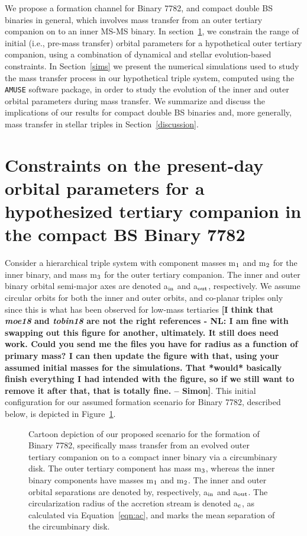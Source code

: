 \documentclass{aastex62}
\def\simon#1{{\bf {\color{red}[#1 -- Simon]}}}
\begin{document}
We propose a formation channel for Binary 7782, and compact double BS
binaries in general, which involves mass transfer from an outer
tertiary companion on to an inner MS-MS binary.  In section~\ref{dyn},
we constrain the range of initial (i.e., pre-mass transfer) orbital
parameters for a hypothetical outer tertiary companion, using a
combination of dynamical and stellar evolution-based constraints.  In
Section~\ref{sims} we present the numerical simulations used to study
the mass transfer process in our hypothetical triple system, computed
using the \texttt{AMUSE}\cite{AMUSE} software package, in order to
study the evolution of the inner and outer orbital parameters during
mass transfer.  We summarize and discuss the implications of our
results for compact double BS binaries and, more generally, mass
transfer in stellar triples in Section~\ref{discussion}.

\section{Constraints on the present-day orbital parameters for a hypothesized tertiary companion in the compact BS Binary 7782} \label{dyn}

Consider a hierarchical triple system with component masses m$_{\rm
  1}$ and m$_{\rm 2}$ for the inner binary, and mass m$_{\rm 3}$ for
the outer tertiary companion.  The inner and outer binary orbital
semi-major axes are denoted a$_{\rm in}$ and a$_{\rm out}$,
respectively.  We assume circular orbits for both the inner and outer
orbits, and co-planar triples only since this is what has been
observed for low-mass tertiaries \cite{2010yCat..73890925T} \simon{I
  think that {\em moe18} and {\em tobin18} are not the right
  references - NL: I am fine with swapping out this figure for another, ultimately.  It still does need work.  Could you send me the files you have for radius as a function of primary mass?  I can then update the figure with that, using your assumed initial masses for the simulations.  That *would* basically finish everything I had intended with the figure, so if we still want to remove it after that, that is totally fine.}.  This initial configuration for our assumed formation
scenario for Binary 7782, described below, is depicted in
Figure~\ref{fig:fig1}.

\begin{figure}[ht!]
\caption{Cartoon depiction of our proposed scenario for the formation
  of Binary 7782, specifically mass transfer from an evolved outer
  tertiary companion on to a compact inner binary via a circumbinary
  disk.  The outer tertiary component has mass m$_{\rm 3}$, whereas
  the inner binary components have masses m$_{\rm 1}$ and m$_{\rm 2}$.
  The inner and outer orbital separations are denoted by,
  respectively, a$_{\rm in}$ and a$_{\rm out}$.  The circularization
  radius of the accretion stream is denoted a$_{\rm c}$, as calculated
  via Equation~\ref{eqn:ac}, and marks the mean separation of the
  circumbinary disk.
\label{fig:fig1}}
\end{figure}
\end{document}
